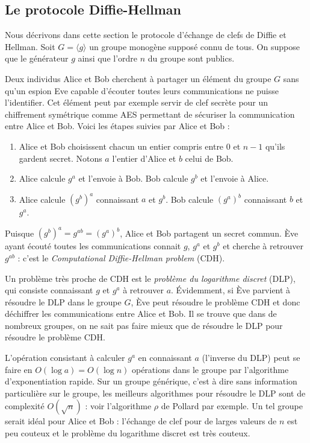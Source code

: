 \documentclass{article}
\theoremstyle{plain}%
\theoremstyle{definition}%
\begin{document}
\subsection{Le protocole Diffie-Hellman}


Nous décrivons dans cette section le protocole d'échange de clefs de Diffie et Hellman. 
Soit $G = \langle g \rangle$ un groupe monogène supposé connu de tous. On suppose que le générateur $g$ ainsi que l'ordre $n$ du groupe sont publics.

Deux individus Alice et Bob cherchent à partager un élément du groupe $G$ sans qu'un espion Eve capable d'écouter toutes leurs communications ne puisse l'identifier. Cet élément peut par exemple servir de clef secrète pour un chiffrement symétrique comme AES permettant de sécuriser la communication entre Alice et Bob.  Voici les étapes suivies par Alice et Bob :
\begin{enumerate}
  \item Alice et Bob choisissent chacun un entier compris entre $0$ et $n-1$ qu'ils gardent secret. Notons $a$ l'entier d'Alice et $b$ celui de Bob.
  \item Alice calcule $g^a$ et l'envoie à Bob. Bob calcule $g^b$ et l'envoie à Alice.
  \item Alice calcule $(g^b)^a$ connaissant $a$ et $g^b$. Bob calcule $(g^a)^b$ connaissant $b$ et $g^a$.
\end{enumerate}
Puisque $(g^b)^a = g^{ab} = (g^a)^b$, Alice et Bob partagent un secret commun. Ève ayant écouté toutes les communications connait $g$, $g^a$ et $g^b$ et cherche à retrouver $g^{ab}$ : c'est le \emph{Computational Diffie-Hellman problem} (CDH).

Un problème très proche de CDH est le \emph{problème du logarithme discret} (DLP), qui consiste connaissant $g$ et $g^a$ à retrouver $a$.
Évidemment, si Ève parvient à résoudre le DLP dans le groupe $G$, Ève peut résoudre le problème CDH et donc déchiffrer les communications entre Alice et Bob. Il se trouve que dans de nombreux groupes, on ne sait pas faire mieux que de résoudre le DLP pour résoudre le problème CDH.

L'opération consistant à calculer $g^a$ en connaissant $a$ (l'inverse du DLP) peut se faire en $O(\log a) = O(\log n)$ opérations dans le groupe par l'algorithme d'exponentiation rapide. 
Sur un groupe générique, c'est à dire sans information particulière sur le groupe, les meilleurs algorithmes pour résoudre le DLP sont de complexité $O(\sqrt{n})$ : voir l'algorithme $\rho$ de Pollard par exemple. Un tel groupe serait idéal pour Alice et Bob : l'échange de clef pour de larges valeurs de $n$ est peu couteux et le problème du logarithme discret est très couteux.
\end{document}
